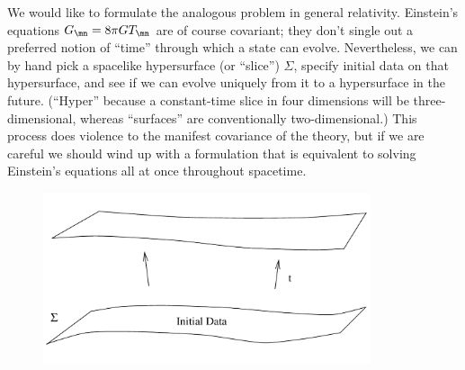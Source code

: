 \documentclass[12pt]{article}
\begin{document}
We would like to formulate the analogous problem in general relativity.
Einstein's equations $G_\mn = 8\pi G T_\mn$ are of course covariant;
they don't single out a preferred notion of ``time'' through which
a state can evolve.  Nevertheless, we can by hand pick a spacelike 
hypersurface (or ``slice'') $\Sigma$, specify initial data on that 
hypersurface, and see if we can evolve uniquely from it to a 
hypersurface in the future.  (``Hyper'' because a constant-time 
slice in four dimensions will be three-dimensional, whereas
``surfaces'' are conventionally two-dimensional.)
This process does violence to the manifest covariance of the theory,
but if we are careful we should wind up with a formulation that is
equivalent to solving Einstein's equations all at once throughout
spacetime.

\begin{figure}
  \centerline{
  \includegraphics[height=5cm]{pdf/four9}}
\end{figure}
\end{document}
